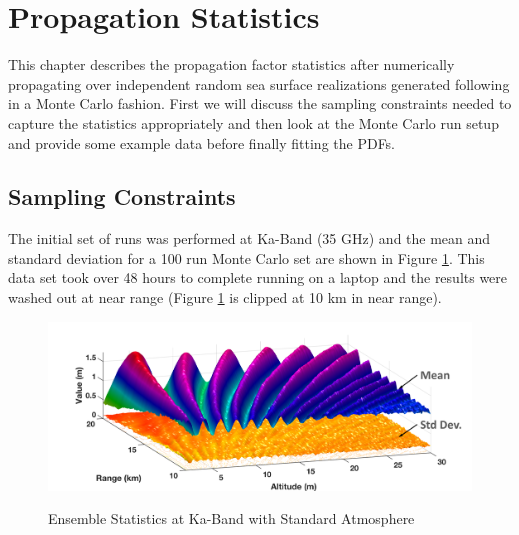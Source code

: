 \renewcommand{\baselinestretch}{2} \small\normalsize
\section{Propagation Statistics}
This chapter describes the propagation factor statistics after numerically propagating over independent random sea surface realizations generated following \cite{frazier_ocean} in a Monte Carlo fashion. First we will discuss the sampling constraints needed to capture the statistics appropriately and then look at the Monte Carlo run setup and provide some example data before finally fitting the PDFs.

\subsection{Sampling Constraints}
The initial set of runs was performed at Ka-Band (35 GHz) and the mean and standard deviation for a 100 run Monte Carlo set are shown in Figure \ref{stat_fig:1}. This data set took over 48 hours to complete running on a laptop and the results were washed out at near range (Figure \ref{stat_fig:1} is clipped at 10 km in near range).

\begin{figure}[H]
  \begin{center}
\includegraphics[width=5in]{../media/statistics/ka_band_stats.png}
  \end{center}
  \renewcommand{\baselinestretch}{1} \small\normalsize
  \begin{quote}
    \caption[Ensemble Statistics at Ka-Band with Standard Atmosphere]{Ensemble Statistics at Ka-Band with Standard Atmosphere\label{stat_fig:1}}
  \end{quote}
\end{figure}
\renewcommand{\baselinestretch}{2} \small\normalsize

